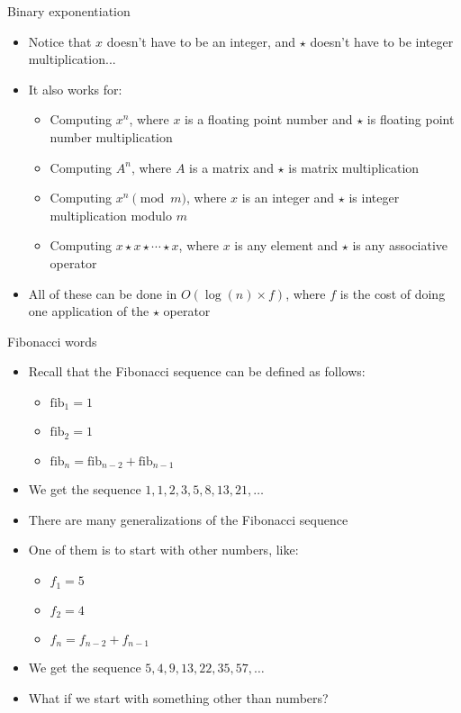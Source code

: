 \documentclass[10pt]{beamer}
\newcommand{\bi}{\begin{itemize}}
\newcommand{\ei}{\end{itemize}}
\begin{document}
\begin{frame}{Binary exponentiation}
    \bi
        \item Notice that $x$ doesn't have to be an integer, and $\star$ doesn't have to be integer multiplication...
        \item It also works for:
            \bi
                \item Computing $x^n$, where $x$ is a floating point number and $\star$ is floating point number multiplication
                \item Computing $A^n$, where $A$ is a matrix and $\star$ is matrix multiplication
                \item Computing $x^n \pmod{m}$, where $x$ is an integer and $\star$ is integer multiplication modulo $m$
                \item Computing $x\star x\star \cdots \star x$, where $x$ is any element and $\star$ is any associative operator
            \ei

        \item All of these can be done in $O(\log(n) \times f)$, where $f$ is the cost of doing one application of the $\star$ operator
    \ei
\end{frame}

\begin{frame}{Fibonacci words}
    \bi
        \item Recall that the Fibonacci sequence can be defined as follows:
            \bi
        \item $\mathrm{fib}_1 = 1$
        \item $\mathrm{fib}_2 = 1$
        \item $\mathrm{fib}_n = \mathrm{fib}_{n-2} + \mathrm{fib}_{n-1}$
            \ei
        \item We get the sequence $1, 1, 2, 3, 5, 8, 13, 21, \ldots$
        \vspace{10pt}
        \item There are many generalizations of the Fibonacci sequence
        \item One of them is to start with other numbers, like:
            \bi
                \item $f_1 = 5$
                \item $f_2 = 4$
                \item $f_n = f_{n-2} + f_{n-1}$
            \ei
        \item We get the sequence $5, 4, 9, 13, 22, 35, 57, \ldots$
        \vspace{10pt}
        \item What if we start with something other than numbers?
    \ei
\end{frame}
\end{document}
